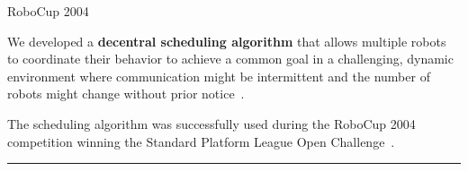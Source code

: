 

\begin{frame}{RoboCup 2004 }

\vspace{1em}
\justifying

We developed a {\bf decentral scheduling algorithm} that allows multiple robots 
to coordinate their behavior to achieve a common goal in a challenging, dynamic 
environment where communication might be intermittent and the number of robots 
might change without prior notice~\cite{Ziegler2004,Dahm2005a}. 
\vspace{1.5em}

\vspace{1.25em}
The scheduling algorithm was successfully used during the RoboCup 2004 
competition winning the Standard Platform League Open Challenge~\cite{Dahm2004}.

\begin{center}
\rule{2cm}{0.4pt}\\[0.5em]
\end{center}

\\[1em]

\end{frame}
